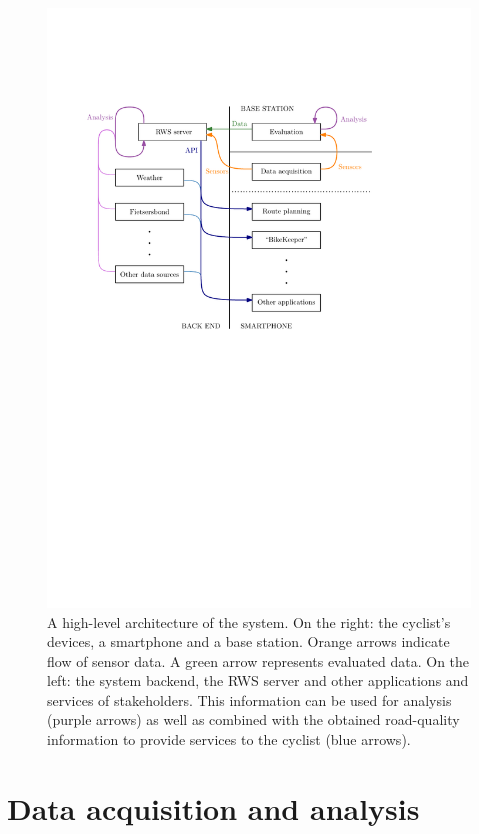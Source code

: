 \documentclass[a4paper,11pt]{article}
\begin{document}
\begin{figure}
\centering
\includegraphics{figures/systemoverview}
\caption{A high-level architecture of the system. On the right: the cyclist's devices, a smartphone and a base station. Orange arrows indicate flow of sensor data. A green arrow represents evaluated data. On the left: the system backend, the RWS server and other applications and services of stakeholders. This information can be used for analysis (purple arrows) as well as combined with the obtained road-quality information to provide services to the cyclist (blue arrows).}
\label{fig:architecture}
\end{figure}

\section{Data acquisition and analysis}
\label{sec:data-acq}
\end{document}
